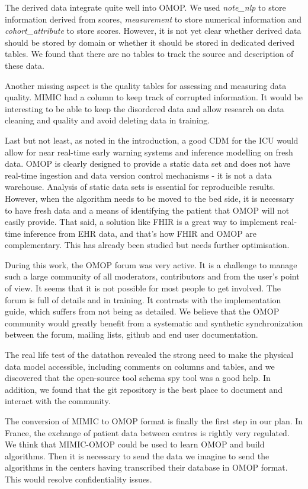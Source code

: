 The derived data integrate quite well into OMOP. We used \textit{note\_nlp} to
store information derived from scores, \textit{measurement} to store numerical
information and \textit{cohort\_attribute} to store scores. However, it is not
yet clear whether derived data should be stored by domain or whether it should
be stored in dedicated derived tables. We found that there are no tables to
track the source and description of these data. 


Another missing aspect is the quality tables for assessing and measuring data 
quality. MIMIC had a column to keep track of corrupted information. 
It would be interesting to be able to keep the disordered data and allow 
research on data cleaning and quality and avoid deleting data in training.



Last but not least, as noted in the introduction, a good CDM for the ICU would 
allow for near real-time early warning systems and inference modelling on fresh 
data. OMOP is clearly designed to provide a static data set and does not have 
real-time ingestion and data version control mechanisms - it is not a data 
warehouse. Analysis of static data sets is essential for reproducible results. 
However, when the algorithm needs to be moved to the bed side, it is necessary 
to have fresh data and a means of identifying the patient that OMOP will not 
easily provide. That said, a solution like FHIR is a great way to implement 
real-time inference from EHR data, and that's how FHIR and OMOP are complementary. 
This has already been studied \cite{gatech}  but needs further optimisation.

During this work, the OMOP forum was very active. It is a challenge to manage 
such a large community of all moderators, contributors and from the user's 
point of view. It seems that it is not possible for most people to get involved. 
The forum is full of details and in training. It contrasts with the implementation 
guide, which suffers from not being as detailed. We believe that the OMOP 
community would greatly benefit from a systematic and synthetic synchronization 
between the forum, mailing lists, github and end user documentation.



The real life test of the datathon revealed the strong need to make the physical 
data model accessible, including comments on columns and tables, and we 
discovered that the open-source tool schema spy tool was a good help. 
In addition, we found that the git repository is the best place to document 
and interact with the community.

The conversion of MIMIC to OMOP format is finally the first step in our plan. 
In France, the exchange of patient data between centres is rightly very regulated. 
We think that MIMIC-OMOP could be used to learn OMOP and build algorithms. 
Then it is necessary to send the data we imagine to send the algorithms in the 
centers having transcribed their database in OMOP format. 
This would resolve confidentiality issues.
